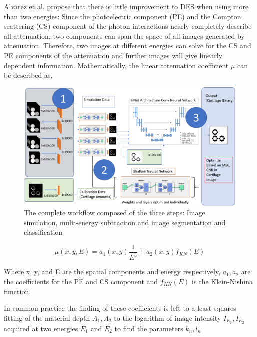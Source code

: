 \documentclass[a4paper,11pt]{article}
\begin{document}
Alvarez et al. \cite{Alvarez1976Energy-selectiveTomography.} propose that there is little improvement to DES when using more than two energies: Since the photoelectric component (PE) and the Compton scattering (CS) component of the photon interactions nearly completely describe all attenuation, two components can span the space of all images generated by attenuation. Therefore, two images at different energies can solve for the CS and PE components of the attenuation and  further images will give linearly dependent information. Mathematically, the linear attenuation coefficient $\mu$ can be described as,

\begin{figure}[htbp]
\centering %
\includegraphics[width=\textwidth]{figures/slide6.png}
\qquad
\caption{The complete workflow composed of the three steps: Image simulation, multi-energy subtraction and image segmentation and classification}
\label{fig:i}
\end{figure}

\begin{equation}
\label{eq:1}
\mu(x,y,E) = a_1(x,y) \frac{1}{E^3}+a_2(x,y) f_{KN}(E)
\end{equation}

Where x, y, and E are the spatial components and energy respectively, $a_1, a_2 $ are the coefficients for the PE and CS component and $f_{KN}(E)$ is the Klein-Nishina function.

In common practice the finding of these coefficients is left to a least squares fitting of the material depth $A_1, A_2$ to the logarithm of image intensity $I_{E_1}, I_{E_2}$ acquired at two energies $E_1$ and $E_2$ to find the parameters ${k_n}, {l_n}$ \cite{Lehmann1981GeneralizedRadiography, Cho2017CalibrationMammography}
\end{document}
